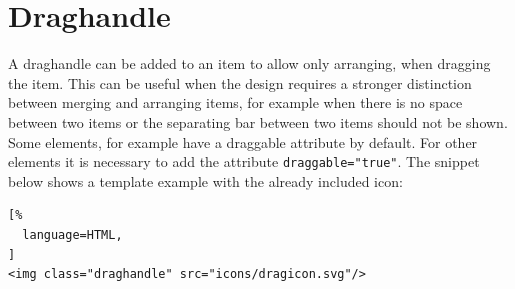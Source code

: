 \section{Draghandle}
\label{sec:libu-draghandle}
A draghandle can be added to an item to allow only arranging, when
dragging the item. This can be useful when the design requires a
stronger distinction between merging and arranging items, for example
when there is no space between two items or the separating bar between
two items should not be shown. Some elements, for example 
have a draggable attribute by default. For other elements it is
necessary to add the attribute \lstinline!draggable="true"!. The snippet
below shows a template example with the already included icon:
\begin{samepage}
\begin{lstlisting}[%
  language=HTML,
]
<img class="draghandle" src="icons/dragicon.svg"/>
\end{lstlisting}
\end{samepage}


